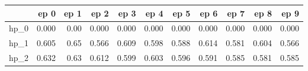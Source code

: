 \begin{tabular}{lrrrrrrrrrr}
\toprule
{} &   ep 0 &  ep 1 &   ep 2 &   ep 3 &   ep 4 &   ep 5 &   ep 6 &   ep 7 &   ep 8 &   ep 9 \\
\midrule
hp\_0 &  0.000 &  0.00 &  0.000 &  0.000 &  0.000 &  0.000 &  0.000 &  0.000 &  0.000 &  0.000 \\
hp\_1 &  0.605 &  0.65 &  0.566 &  0.609 &  0.598 &  0.588 &  0.614 &  0.581 &  0.604 &  0.566 \\
hp\_2 &  0.632 &  0.63 &  0.612 &  0.599 &  0.603 &  0.596 &  0.591 &  0.585 &  0.581 &  0.585 \\
\bottomrule
\end{tabular}
